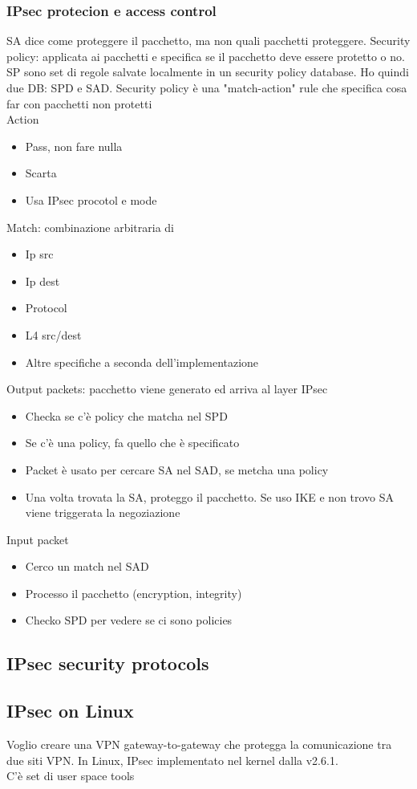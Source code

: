 \documentclass[16px]{article}
\begin{document}
\subsubsection{IPsec protecion e access control}
SA dice come proteggere il pacchetto, ma non quali pacchetti proteggere. Security policy: applicata ai pacchetti e specifica se il pacchetto deve essere protetto o no. SP sono set di regole salvate localmente in un security policy database. Ho quindi due DB: SPD e SAD. Security policy è una "match-action" rule che specifica cosa far con pacchetti non protetti\\
Action
\begin{itemize}
\item Pass, non fare nulla
\item Scarta 
\item Usa IPsec procotol e mode
\end{itemize}
Match: combinazione arbitraria di
\begin{itemize}
\item Ip src 
\item Ip dest
\item Protocol
\item L4 src/dest
\item Altre specifiche a seconda dell'implementazione
\end{itemize}
Output packets: pacchetto viene generato ed arriva al layer IPsec
\begin{itemize}
\item Checka se c'è policy che matcha nel SPD
\item Se c'è una policy, fa quello che è specificato
\item Packet è usato per cercare SA nel SAD, se metcha una policy
\item Una volta trovata la SA, proteggo il pacchetto. Se uso IKE e non trovo SA viene triggerata la negoziazione
\end{itemize}
Input packet
\begin{itemize}
\item Cerco un match nel SAD
\item Processo il pacchetto (encryption, integrity)
\item Checko SPD per vedere se ci sono policies
\end{itemize}
\subsection{IPsec security protocols}
\subsection{IPsec on Linux}
Voglio creare una VPN gateway-to-gateway che protegga la comunicazione tra due siti VPN. In Linux, IPsec implementato nel kernel dalla v2.6.1.\\ C'è set di user space tools
\end{document}
